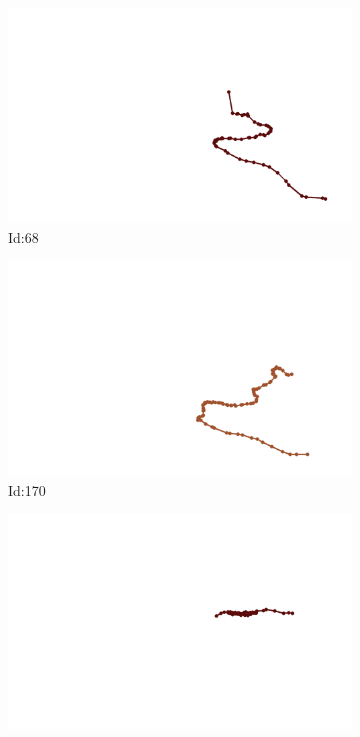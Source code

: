 \documentclass[12pt,twoside]{report}
\begin{document}
\begin{figure}
\centering
\begin{subfigure}[b]{0.20\textwidth}
\centering
\includegraphics[width=\textwidth]{../../trajectories/68.png}
\caption{Id:68}
\end{subfigure}
\begin{subfigure}[b]{0.20\textwidth}
\centering
\includegraphics[width=\textwidth]{../../trajectories/170.png}
\caption{Id:170}
\end{subfigure}
\begin{subfigure}[b]{0.20\textwidth}
\centering
\includegraphics[width=\textwidth]{../../trajectories/250.png}

\end{subfigure}
\end{figure}
\end{document}
